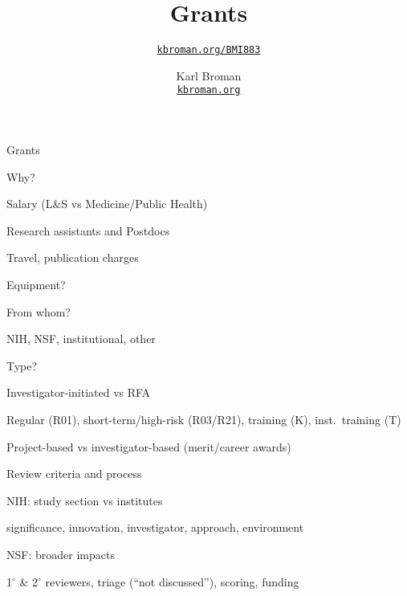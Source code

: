 \documentclass[aspectratio=169,12pt,t]{beamer}
\title{Grants}
\subtitle{}
\author{\href{https://kbroman.org/BMI883}{\tt kbroman.org/BMI883} }
\institute{}
\date{\small \hspace{3in} Karl Broman \\
  \hspace{3in} \href{https://kbroman.org}{\color{foreground}
    \small \tt kbroman.org}}
\begin{document}
{




\begin{frame}{Grants}

\bi
\item Why?
    \bi
    \item Salary (L\&S vs Medicine/Public Health)
    \item Research assistants and Postdocs
    \item Travel, publication charges
    \item Equipment?
    \ei
\item From whom?
    \bi
    \item NIH, NSF, institutional, other
    \ei
\item Type?
    \bi
    \item Investigator-initiated vs RFA
    \item Regular (R01), short-term/high-risk (R03/R21), training (K),
      inst.\ training (T)
    \item Project-based vs investigator-based (merit/career awards)
    \ei
\item Review criteria and process
    \bi
    \item NIH: study section vs institutes
    \item {\footnotesize significance, innovation, investigator, approach, environment}
    \item NSF: broader impacts
    \item 1$^{\circ}$ \& 2$^{\circ}$ reviewers, triage (``not discussed''), scoring, funding
    \ei
\ei

\end{frame}


}
\end{document}
